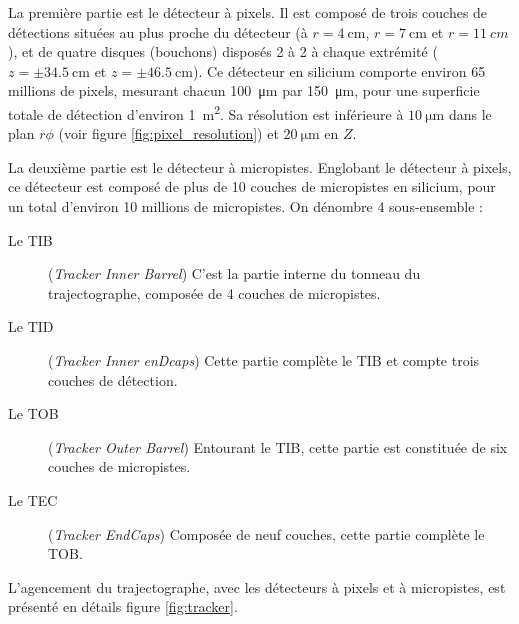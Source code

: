\smallskip

La première partie est le détecteur à pixels. Il est composé de trois couches de détections situées au plus proche du détecteur (à $r = \SI{4}{\cm}$, $r = \SI{7}{\cm}$ et $r = \SI{11}{cm}$), et de quatre disques (bouchons) disposés 2 à 2 à chaque extrémité ($z = \pm \SI{34.5}{\cm}$ et $z = \pm \SI{46.5}{\cm}$). Ce détecteur en silicium comporte environ 65 millions de pixels, mesurant chacun \SI{100}{\um} par \SI{150}{\um}, pour une superficie totale de détection d'environ \SI{1}{\square\m}. Sa résolution est inférieure à $\SI{10}{\um}$ dans le plan $r\phi$ (voir figure \ref{fig:pixel_resolution}) et $\SI{20}{\um}$ en $Z$.

La deuxième partie est le détecteur à micropistes. Englobant le détecteur à pixels, ce détecteur est composé de plus de 10 couches de micropistes en silicium, pour un total d'environ 10 millions de micropistes. On dénombre 4 sous-ensemble :

\begin{description}
  \item[Le TIB] (\emph{Tracker Inner Barrel}) C'est la partie interne du tonneau du trajectographe, composée de 4 couches de micropistes.
  \item[Le TID] (\emph{Tracker Inner enDcaps}) Cette partie complète le TIB et compte trois couches de détection.
  \item[Le TOB] (\emph{Tracker Outer Barrel}) Entourant le TIB, cette partie est constituée de six couches de micropistes.
  \item[Le TEC] (\emph{Tracker EndCaps}) Composée de neuf couches, cette partie complète le TOB.
\end{description}

L'agencement du trajectographe, avec les détecteurs à pixels et à micropistes, est présenté en détails figure \ref{fig:tracker}.

